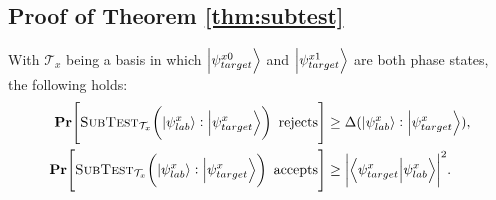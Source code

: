 \subsection{Proof of Theorem \ref{thm:subtest}}
\begin{theorem}
    With $\mathcal{T}_x$ being a basis in which $\ket{\psi_{target}^{x0}}$ and $\ket{\psi_{target}^{x1}}$ are both phase states, the following holds:
    \begin{align}
        \operatorname{{\bf Pr}}\!\left[\textsc{SubTest}_{\mathcal{T}_x}\!\left(\ket{\psi_{lab}^x}:\ket{\psi_{target}^x}\right) \text{ rejects}\right]
            &\geq \Delta(\ket{\psi_{lab}^x}:\ket{\psi_{target}^x}), \\
        \operatorname{{\bf Pr}}\!\left[\textsc{SubTest}_{\mathcal{T}_x}\!\left(\ket{\psi_{lab}^x}:\ket{\psi_{target}^x}\right) \text{ accepts}\right]
            &\geq {\left| \braket{\psi_{target}^x}{\psi_{lab}^x} \right|}^2. 
    \end{align}
\end{theorem}
